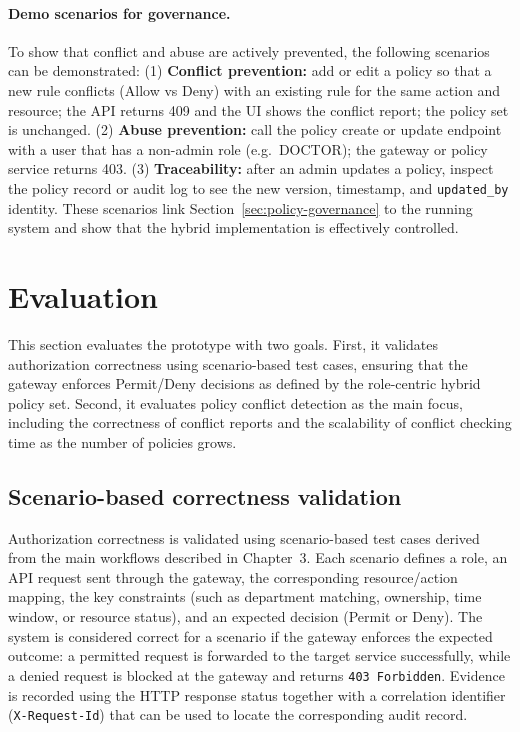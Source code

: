 \paragraph{Demo scenarios for governance.}
To show that conflict and abuse are actively prevented, the following scenarios can be demonstrated: (1) \textbf{Conflict prevention:} add or edit a policy so that a new rule conflicts (Allow vs Deny) with an existing rule for the same action and resource; the API returns 409 and the UI shows the conflict report; the policy set is unchanged. (2) \textbf{Abuse prevention:} call the policy create or update endpoint with a user that has a non-admin role (e.g.\ DOCTOR); the gateway or policy service returns 403. (3) \textbf{Traceability:} after an admin updates a policy, inspect the policy record or audit log to see the new version, timestamp, and \texttt{updated\_by} identity. These scenarios link Section~\ref{sec:policy-governance} to the running system and show that the hybrid implementation is effectively controlled.
\vspace{0.5cm}

\section{Evaluation}
\label{sec:evaluation}

This section evaluates the prototype with two goals. First, it validates authorization correctness using scenario-based test
cases, ensuring that the gateway enforces Permit/Deny decisions as defined by the role-centric hybrid policy set. Second, it
evaluates policy conflict detection as the main focus, including the correctness of conflict reports and the scalability of
conflict checking time as the number of policies grows.

\subsection{Scenario-based correctness validation}
Authorization correctness is validated using scenario-based test cases derived from the main workflows described in
Chapter~3. Each scenario defines a role, an API request sent through the gateway, the corresponding resource/action
mapping, the key constraints (such as department matching, ownership, time window, or resource status), and an expected
decision (Permit or Deny). The system is considered correct for a scenario if the gateway enforces the expected outcome:
a permitted request is forwarded to the target service successfully, while a denied request is blocked at the gateway and
returns \texttt{403 Forbidden}. Evidence is recorded using the HTTP response status together with a correlation identifier
(\texttt{X-Request-Id}) that can be used to locate the corresponding audit record.
\vspace{0.5cm}


